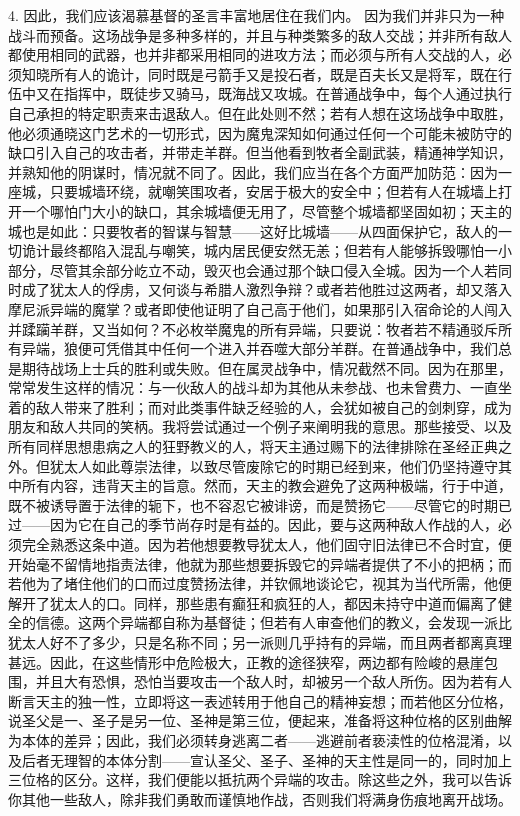 4. 因此，我们应该渴慕基督的圣言丰富地居住在我们内。 因为我们并非只为一种战斗而预备。这场战争是多种多样的，并且与种类繁多的敌人交战；并非所有敌人都使用相同的武器，也并非都采用相同的进攻方法；而必须与所有人交战的人，必须知晓所有人的诡计，同时既是弓箭手又是投石者，既是百夫长又是将军，既在行伍中又在指挥中，既徒步又骑马，既海战又攻城。在普通战争中，每个人通过执行自己承担的特定职责来击退敌人。但在此处则不然；若有人想在这场战争中取胜，他必须通晓这门艺术的一切形式，因为魔鬼深知如何通过任何一个可能未被防守的缺口引入自己的攻击者，并带走羊群。但当他看到牧者全副武装，精通神学知识，并熟知他的阴谋时，情况就不同了。因此，我们应当在各个方面严加防范：因为一座城，只要城墙环绕，就嘲笑围攻者，安居于极大的安全中；但若有人在城墙上打开一个哪怕门大小的缺口，其余城墙便无用了，尽管整个城墙都坚固如初；天主的城也是如此：只要牧者的智谋与智慧——这好比城墙——从四面保护它，敌人的一切诡计最终都陷入混乱与嘲笑，城内居民便安然无恙；但若有人能够拆毁哪怕一小部分，尽管其余部分屹立不动，毁灭也会通过那个缺口侵入全城。因为一个人若同时成了犹太人的俘虏，又何谈与希腊人激烈争辩？或者若他胜过这两者，却又落入摩尼派异端的魔掌？或者即使他证明了自己高于他们，如果那引入宿命论的人闯入并蹂躏羊群，又当如何？不必枚举魔鬼的所有异端，只要说：牧者若不精通驳斥所有异端，狼便可凭借其中任何一个进入并吞噬大部分羊群。在普通战争中，我们总是期待战场上士兵的胜利或失败。但在属灵战争中，情况截然不同。因为在那里，常常发生这样的情况：与一伙敌人的战斗却为其他从未参战、也未曾费力、一直坐着的敌人带来了胜利；而对此类事件缺乏经验的人，会犹如被自己的剑刺穿，成为朋友和敌人共同的笑柄。我将尝试通过一个例子来阐明我的意思。那些接受、以及所有同样思想患病之人的狂野教义的人，将天主通过赐下的法律排除在圣经正典之外。但犹太人如此尊崇法律，以致尽管废除它的时期已经到来，他们仍坚持遵守其中所有内容，违背天主的旨意。然而，天主的教会避免了这两种极端，行于中道，既不被诱导置于法律的轭下，也不容忍它被诽谤，而是赞扬它——尽管它的时期已过——因为它在自己的季节尚存时是有益的。因此，要与这两种敌人作战的人，必须完全熟悉这条中道。因为若他想要教导犹太人，他们固守旧法律已不合时宜，便开始毫不留情地指责法律，他就为那些想要拆毁它的异端者提供了不小的把柄；而若他为了堵住他们的口而过度赞扬法律，并钦佩地谈论它，视其为当代所需，他便解开了犹太人的口。同样，那些患有癫狂和疯狂的人，都因未持守中道而偏离了健全的信德。这两个异端都自称为基督徒；但若有人审查他们的教义，会发现一派比犹太人好不了多少，只是名称不同；另一派则几乎持有的异端，而且两者都离真理甚远。因此，在这些情形中危险极大，正教的途径狭窄，两边都有险峻的悬崖包围，并且大有恐惧，恐怕当要攻击一个敌人时，却被另一个敌人所伤。因为若有人断言天主的独一性，立即将这一表述转用于他自己的精神妄想；而若他区分位格，说圣父是一、圣子是另一位、圣神是第三位，便起来，准备将这种位格的区别曲解为本体的差异；因此，我们必须转身逃离二者——逃避前者亵渎性的位格混淆，以及后者无理智的本体分割——宣认圣父、圣子、圣神的天主性是同一的，同时加上三位格的区分。这样，我们便能以抵抗两个异端的攻击。除这些之外，我可以告诉你其他一些敌人，除非我们勇敢而谨慎地作战，否则我们将满身伤痕地离开战场。\par

